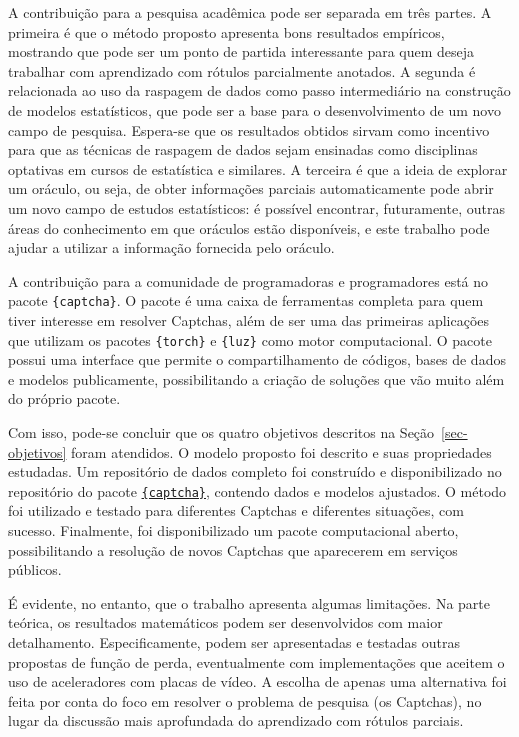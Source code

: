 \documentclass[12pt,twoside,brazilian]{book}
\begin{document}
A contribuição para a pesquisa acadêmica pode ser separada em três
partes. A primeira é que o método proposto apresenta bons resultados
empíricos, mostrando que pode ser um ponto de partida interessante para
quem deseja trabalhar com aprendizado com rótulos parcialmente anotados.
A segunda é relacionada ao uso da raspagem de dados como passo
intermediário na construção de modelos estatísticos, que pode ser a base
para o desenvolvimento de um novo campo de pesquisa. Espera-se que os
resultados obtidos sirvam como incentivo para que as técnicas de
raspagem de dados sejam ensinadas como disciplinas optativas em cursos
de estatística e similares. A terceira é que a ideia de explorar um
oráculo, ou seja, de obter informações parciais automaticamente pode
abrir um novo campo de estudos estatísticos: é possível encontrar,
futuramente, outras áreas do conhecimento em que oráculos estão
disponíveis, e este trabalho pode ajudar a utilizar a informação
fornecida pelo oráculo.

A contribuição para a comunidade de programadoras e programadores está
no pacote \texttt{\{captcha\}}. O pacote é uma caixa de ferramentas
completa para quem tiver interesse em resolver Captchas, além de ser uma
das primeiras aplicações que utilizam os pacotes \texttt{\{torch\}} e
\texttt{\{luz\}} como motor computacional. O pacote possui uma interface
que permite o compartilhamento de códigos, bases de dados e modelos
publicamente, possibilitando a criação de soluções que vão muito além do
próprio pacote.

Com isso, pode-se concluir que os quatro objetivos descritos na
Seção~\ref{sec-objetivos} foram atendidos. O modelo proposto foi
descrito e suas propriedades estudadas. Um repositório de dados completo
foi construído e disponibilizado no repositório do pacote
\href{https://github.com/decryptr/captcha/releases}{\texttt{\{captcha\}}},
contendo dados e modelos ajustados. O método foi utilizado e testado
para diferentes Captchas e diferentes situações, com sucesso.
Finalmente, foi disponibilizado um pacote computacional aberto,
possibilitando a resolução de novos Captchas que aparecerem em serviços
públicos.

É evidente, no entanto, que o trabalho apresenta algumas limitações. Na
parte teórica, os resultados matemáticos podem ser desenvolvidos com
maior detalhamento. Especificamente, podem ser apresentadas e testadas
outras propostas de função de perda, eventualmente com implementações
que aceitem o uso de aceleradores com placas de vídeo. A escolha de
apenas uma alternativa foi feita por conta do foco em resolver o
problema de pesquisa (os Captchas), no lugar da discussão mais
aprofundada do aprendizado com rótulos parciais.
\end{document}
